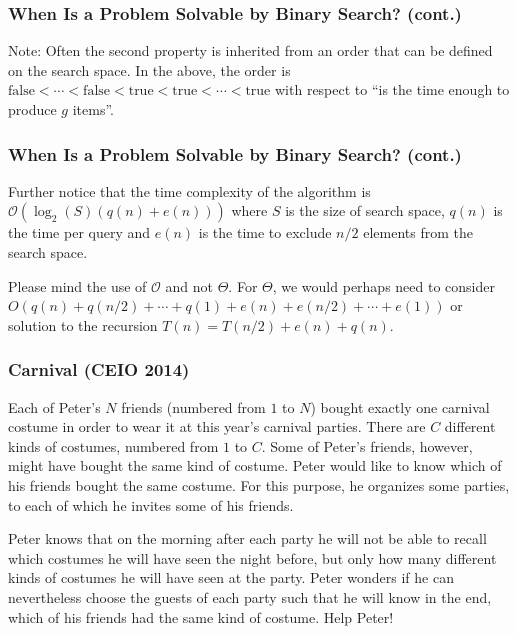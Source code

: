 \documentclass{beamer}
\begin{document}
\begin{frame}
\frametitle{When Is a Problem Solvable by Binary Search? (cont.)}

    Note: Often the second property is inherited from an order that can be defined on the search space. In the above, the order is $\text{false} < \cdots < \text{false} < \text{true} < \text{true} < \cdots < \text{true}$ with respect to ``is the time enough to produce $g$ items''.
\end{frame}

\begin{frame}
\frametitle{When Is a Problem Solvable by Binary Search? (cont.)}

Further notice that the time complexity of the algorithm is $\mathcal{O}(\log_2(S) (q(n) + e(n)))$ where $S$ is the size of search space, $q(n)$ is the time per query and $e(n)$ is the time to exclude $n/2$ elements from the search space.

Please mind the use of $\mathcal{O}$ and not $\Theta$. For $\Theta$, we would perhaps need to consider $O(q(n) + q(n/2) + \cdots + q(1) + e(n) + e(n/2) + \cdots + e(1))$ or solution to the recursion $T(n) = T(n/2) + e(n) + q(n)$.
\end{frame}

\begin{frame}[fragile]
\frametitle{Carnival (CEIO 2014)}

Each of Peter's $N$ friends (numbered from $1$ to $N$) bought exactly one carnival costume in order to wear it at this year's carnival parties. There are $C$ different kinds of costumes, numbered from $1$ to $C$. Some of Peter's friends, however, might have bought the same kind of costume. Peter would like to know which of his friends bought the same costume. For this purpose, he organizes some parties, to each of which he invites some of his friends.

Peter knows that on the morning after each party he will not be able to recall which costumes he will have seen the night before, but only how many different kinds of costumes he will have seen at the party. Peter wonders if he can nevertheless choose the guests of each party such that he will know in the end, which of his friends had the same kind of costume. Help Peter!

\end{frame}

\begin{frame}
\end{frame}

\begin{frame}
\end{frame}
\end{document}
